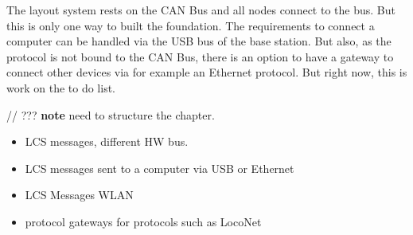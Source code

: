 
The layout system rests on the CAN Bus and all nodes connect to the bus. But this is only one way to built the foundation. The requirements to connect a computer can be handled via the USB bus of the base station. But also, as the protocol is not bound to the CAN Bus, there is an option to have a gateway to connect other devices via for example an Ethernet protocol. But right now, this is work on the to do list.

// ??? \textbf{note}  need to structure the chapter.
\begin{itemize}
\item LCS messages, different HW bus.
\item LCS messages sent to a computer via USB or Ethernet
\item LCS Messages WLAN
\item protocol gateways for protocols such as LocoNet
\end{itemize}
